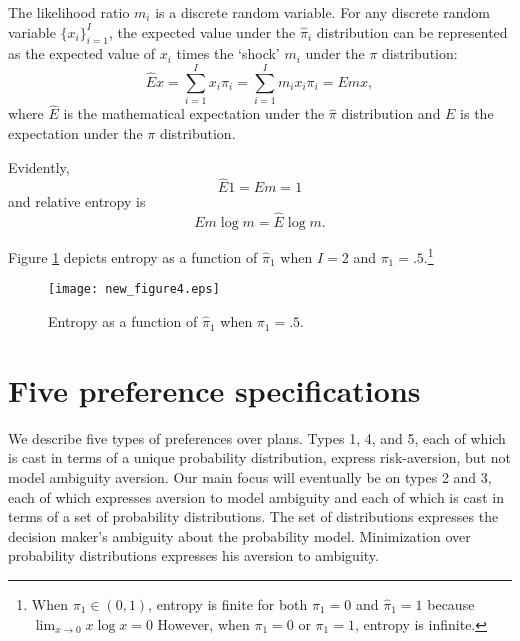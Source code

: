 % 
\begin{remark}\label{remark1}
The likelihood ratio $m_i$ is a discrete random variable.
For any discrete random variable $\{x_i\}_{i=1}^I$, the expected  value under the $\hat \pi_i$ distribution can
be represented as the expected  value of  $x_i$ times the `shock'  $m_i$ under the $\pi$ distribution:
\[ \hat E x = \sum_{i=1}^I x_i \hat \pi_i = \sum_{i=1}^I m_i x_i  \pi_i = E m x ,\]
where $\hat E$ is the mathematical  expectation under the $\hat \pi$ distribution and $E$ is the
expectation under the $\pi$ distribution.
\end{remark}

\noindent Evidently,
\[ \hat E 1 = E m = 1\]
and relative entropy is
\[ E m \log m  = \hat E \log m .\]

 Figure \ref{fig_entropy_I2} depicts
 entropy as a function of $\hat \pi_1$ when $I=2$ and $\pi_1 = .5$.\footnote{When $\pi_1 \in (0,1)$, entropy is finite for both $\hat \pi_1 = 0$
 and $\hat \pi_1 = 1$ because $\lim_{x\rightarrow 0} x \log x = 0$  However, when $\pi_1=0$ or $\pi_1=1$, entropy
 is infinite.}
\begin{figure}[htp]
\centering
\texttt{[image: new\_figure4.eps]}
\caption[Entropy]{Entropy as a function of $\hat \pi_1$ when $\pi_1 = .5$.}\label{fig_entropy_I2}
\end{figure}



\section{Five preference specifications}

We describe five types of preferences over plans.  Types 1, 4, and 5, each of which is cast in terms of a unique probability distribution,
express risk-aversion, but not model  ambiguity aversion.  Our main focus will eventually be on types 2 and 3, each of  which expresses 
aversion to model ambiguity and each of which 
is cast in terms of a set  of probability distributions.  The set of distributions expresses the decision maker's  ambiguity about the probability model.  Minimization over probability distributions expresses his aversion to ambiguity.

